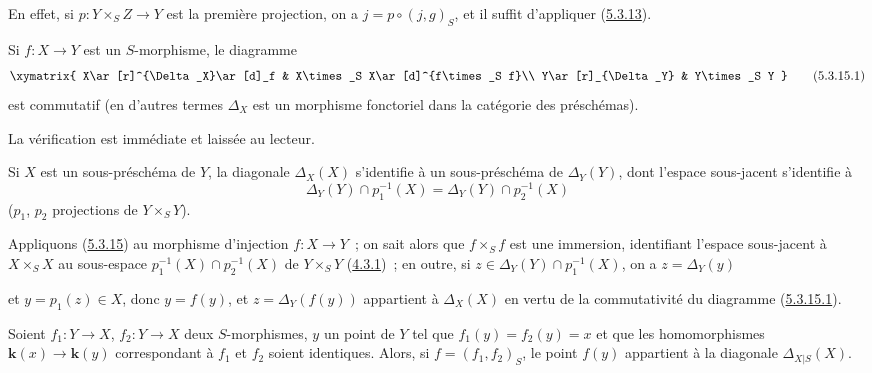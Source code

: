 En effet, si $p:Y\times_S Z\to Y$ est la première projection, on a
$j=p\circ(j,g)_S$, et il suffit d'appliquer
(\hyperref[I.5.3.13-fr]{5.3.13}).

\begin{proposition}[5.3.15]
\label{I.5.3.15-fr}
Si $f:X\to Y$ est un $S$-morphisme, le diagramme
\[
  \xymatrix{
    X\ar[r]^{\Delta_X}\ar[d]_f &
    X\times_S X\ar[d]^{f\times_S f}\\
    Y\ar[r]_{\Delta_Y} &
    Y\times_S Y
  }
  \tag{5.3.15.1}\label{I.5.3.15.1-fr}
\]
est commutatif \textup{(en d'autres termes $\Delta_X$ est un morphisme fonctoriel
dans la catégorie des préschémas)}.
\end{proposition}

La vérification est immédiate et laissée au lecteur.

\begin{corollary}[5.3.16]
\label{I.5.3.16-fr}
Si $X$ est un sous-préschéma de $Y$, la diagonale $\Delta_X(X)$ s'identifie à
un sous-préschéma de $\Delta_Y(Y)$, dont l'espace sous-jacent s'identifie à
\[
  \Delta_Y(Y)\cap p_1^{-1}(X)=\Delta_Y(Y)\cap p_2^{-1}(X)
\]
($p_1$, $p_2$ projections de $Y\times_S Y$).
\end{corollary}

Appliquons (\hyperref[I.5.3.15-fr]{5.3.15}) au morphisme d'injection
$f:X\to Y$~; on sait alors que $f\times_S f$ est une immersion, identifiant
l'espace sous-jacent à $X\times_S X$ au sous-espace
$p_1^{-1}(X)\cap p_2^{-1}(X)$ de $Y\times_S Y$
(\hyperref[I.4.3.1-fr]{4.3.1})~; en outre, si
$z\in\Delta_Y(Y)\cap p_1^{-1}(X)$, on a $z=\Delta_Y(y)$

et $y=p_1(z)\in X$, donc $y=f(y)$, et $z=\Delta_Y(f(y))$ appartient à
$\Delta_X(X)$ en vertu de la commutativité du diagramme
(\hyperref[I.5.3.15.1-fr]{5.3.15.1}).

\begin{corollary}[5.3.17]
\label{I.5.3.17-fr}
Soient $f_1:Y\to X$, $f_2:Y\to X$ deux $S$-morphismes, $y$ un point de $Y$
tel que $f_1(y)=f_2(y)=x$ et que les homomorphismes $\boldsymbol{k}(x)\to\boldsymbol{k}(y)$
correspondant à $f_1$ et $f_2$ soient identiques. Alors, si
$f=(f_1,f_2)_S$, le point $f(y)$ appartient à la diagonale
$\Delta_{X|S}(X)$.
\end{corollary}


